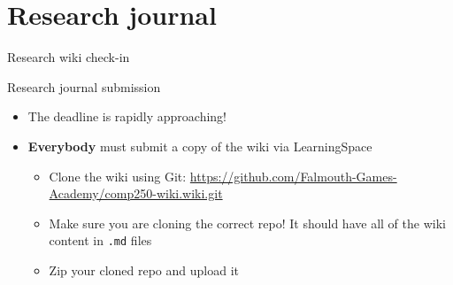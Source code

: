 \part{Research journal}
\frame{\partpage}

\begin{frame}{Research wiki check-in}
\end{frame}

\begin{frame}{Research journal submission}
	\begin{itemize}
		\pause\item The deadline is rapidly approaching!
		\pause\item \textbf{Everybody} must submit a copy of the wiki via LearningSpace
			\begin{itemize}
				\pause\item Clone the wiki using Git: \url{https://github.com/Falmouth-Games-Academy/comp250-wiki.wiki.git}
				\pause\item Make sure you are cloning the correct repo! It should have all of the wiki content in
					\texttt{.md} files
				\pause\item Zip your cloned repo and upload it
			\end{itemize}
	\end{itemize}
\end{frame}

